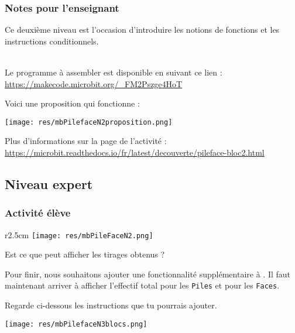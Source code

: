 \newpage
\subsubsection{Notes pour l'enseignant}

Ce deuxième niveau est l'occasion d'introduire les notions de fonctions et les instructions conditionnels.


\\ Le programme à assembler est disponible en suivant ce lien :
~\\ \url{https://makecode.microbit.org/_FM2Pszge4HoT}

\begin{methode}
Voici une proposition qui fonctionne :

\texttt{[image: res/mbPilefaceN2proposition.png]}
\end{methode}

\begin{remarque}
Plus d'informations sur la page de l'activité :\\ \url{https://microbit.readthedocs.io/fr/latest/decouverte/pileface-bloc2.html}
\end{remarque}





%
%
\newpage
\subsection{Niveau expert}
\subsubsection{Activité élève}



\begin{wrapfigure}[4]{r}{2.5cm}
    \texttt{[image: res/mbPileFaceN2.png]}
\end{wrapfigure}
\begin{eleve}
Est ce que \mb peut afficher les tirages obtenus ?

Pour finir, nous souhaitons ajouter une fonctionnalité supplémentaire à \mb. Il faut maintenant arriver à afficher l'effectif total pour les \texttt{Piles} et pour les \texttt{Faces}.

Regarde ci-dessous les instructions que tu pourrais ajouter.

\centerline{\texttt{[image: res/mbPilefaceN3blocs.png]}}
\end{eleve}



